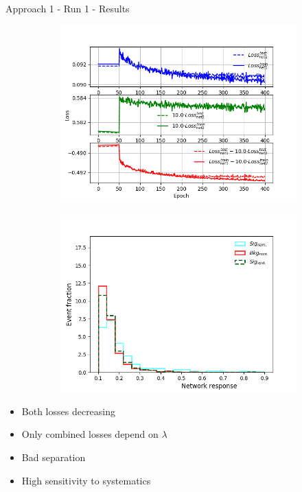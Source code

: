 \begin{frame}{Approach 1 - Run 1 - Results}
    \begin{figure}[htbp]
    \centering
    \begin{subfigure}[b]{0.4\textwidth}
        \includegraphics[width=\textwidth]{app1/full_classic_losses.png}
        \label{fig:simple:final:sepa}
    \end{subfigure}
\quad
    \begin{subfigure}[b]{0.4\textwidth}
        \includegraphics[width=\textwidth]{app1/full_classic_syst.png}
        \label{fig:simple:final:syst}
    \end{subfigure}
    \end{figure}
    \begin{itemize}
        \item Both losses decreasing
        \item Only combined losses depend on $\lambda$
        \item Bad separation
        \item High sensitivity to systematics
    \end{itemize}
\end{frame}

